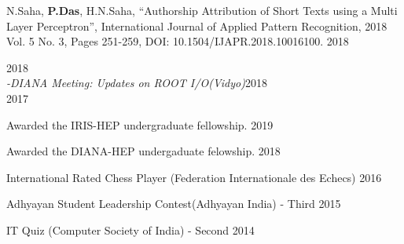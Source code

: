 \documentclass[10pt, letterpaper]{deps1}
\begin{document}
%
%
\small{\begin{tightitemize}
    \item N.Saha, {\textbf{P.Das}}, H.N.Saha, ``Authorship Attribution of Short Texts using a Multi Layer Perceptron'', International Journal of Applied Pattern Recognition, 2018 Vol. 5 No. 3, Pages 251-259, DOI: 10.1504/IJAPR.2018.10016100. \hfill{2018}
\end{tightitemize}}

%
%
\vspace{-5pt}
 \hfill{2018}\\
\hspace*{1ex}\hspace*{1ex}\hspace*{1ex}\hspace*{1ex}\hspace*{1ex}\hspace*{1ex}\hspace*{1ex}\hspace*{0.4ex}\textit{{\small {-DIANA Meeting: Updates on ROOT I/O(Vidyo)}}}\hfill{2018}\\
\hfill{2017}\\
\vspace{-15pt}

%
%

%
%
\begin{tightitemize}
    \item Awarded the IRIS-HEP undergraduate fellowship. \hfill{2019}
	\item Awarded the DIANA-HEP undergaduate felowship. \hfill{2018}
	\item International Rated Chess Player (Federation Internationale des Echecs) \hfill{2016}
	\item Adhyayan Student Leadership Contest(Adhyayan India) - Third \hfill{2015}
	\item IT Quiz (Computer Society of India) - Second \hfill{2014}
\end{tightitemize}
\end{document}
